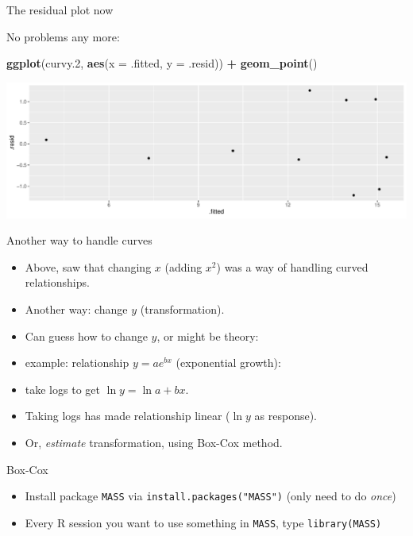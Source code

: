 \documentclass[
  ignorenonframetext,
]{beamer}
\newenvironment{Shaded}{\begin{snugshade}}{\end{snugshade}}
\newcommand{\DataTypeTok}[1]{\textcolor[rgb]{0.13,0.29,0.53}{#1}}
\newcommand{\FloatTok}[1]{\textcolor[rgb]{0.00,0.00,0.81}{#1}}
\newcommand{\KeywordTok}[1]{\textcolor[rgb]{0.13,0.29,0.53}{\textbf{#1}}}
\newcommand{\NormalTok}[1]{#1}
\newcommand{\OperatorTok}[1]{\textcolor[rgb]{0.81,0.36,0.00}{\textbf{#1}}}
\newcommand{\StringTok}[1]{\textcolor[rgb]{0.31,0.60,0.02}{#1}}
\begin{document}
\begin{frame}[fragile]{The residual plot now}
\protect\hypertarget{the-residual-plot-now}{}

No problems any more:

\begin{Shaded}
\begin{Highlighting}[]
\KeywordTok{ggplot}\NormalTok{(curvy}\FloatTok{.2}\NormalTok{, }\KeywordTok{aes}\NormalTok{(}\DataTypeTok{x =}\NormalTok{ .fitted, }\DataTypeTok{y =}\NormalTok{ .resid)) }\OperatorTok{+}\StringTok{ }\KeywordTok{geom_point}\NormalTok{()}
\end{Highlighting}
\end{Shaded}

\includegraphics{slides_d29_files/figure-beamer/unnamed-chunk-47-1.pdf}

\end{frame}

\begin{frame}{Another way to handle curves}
\protect\hypertarget{another-way-to-handle-curves}{}

\begin{itemize}
\item
  Above, saw that changing \(x\) (adding \(x^2\)) was a way of handling
  curved relationships.
\item
  Another way: change \(y\) (transformation).
\item
  Can guess how to change \(y\), or might be theory:
\item
  example: relationship \(y=ae^{bx}\) (exponential growth):
\item
  take logs to get \(\ln y=\ln a + bx\).
\item
  Taking logs has made relationship linear (\(\ln y\) as response).
\item
  Or, \emph{estimate} transformation, using Box-Cox method.
\end{itemize}

\end{frame}

\begin{frame}[fragile]{Box-Cox}
\protect\hypertarget{box-cox}{}

\begin{itemize}
\item
  Install package \texttt{MASS} via \texttt{install.packages("MASS")}
  (only need to do \emph{once})
\item
  Every R session you want to use something in \texttt{MASS}, type
  \texttt{library(MASS)}
\end{itemize}

\end{frame}
\end{document}
